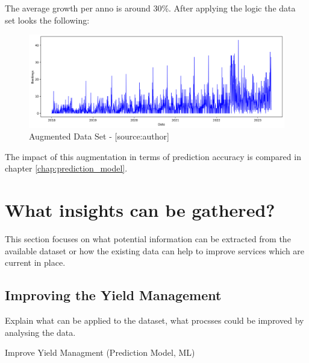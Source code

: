 The average growth per anno is around 30\%. After applying the logic the data set looks the following:  
\begin{figure}[H]
	\centering
		\includegraphics[width=14cm]{images/with_augmentation}
	\caption{Augmented Data Set - [source:author]}
	\label{fig:noAug}
\end{figure}
The impact of this augmentation in terms of prediction accuracy is compared in chapter \ref{chap:prediction_model}.

\section{What insights can be gathered?}
This section focuses on what potential information can be extracted from the available dataset or how the existing data can help to improve services which are current in place.  


\subsection{Improving the Yield Management}

Explain what can be applied to the dataset, what procsses could be improved by analysing the data. 

Improve Yield Managment  (Prediction Model, ML) 

